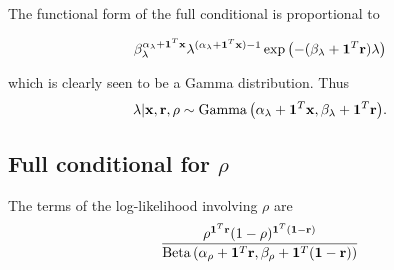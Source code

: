\documentclass{amsart}
\begin{document}
%
%
%

The functional form of the full conditional is proportional to

$$
\beta_{\lambda}^{\alpha_\lambda+{\bf 1}^T{\bf x}} \lambda^{(\alpha_\lambda + {\bf 1}^T{\bf x}) - 1} \exp{\left(-(\beta_\lambda + {\bf1}^T{\bf r}) \lambda \right)}
$$

\noindent which is clearly seen to be a Gamma distribution. Thus
$$
\lambda | {\bf x}, {\bf r}, \rho \sim {\text{Gamma} \left( \alpha_\lambda + {\bf1}^T{\bf x}, \beta_\lambda + {\bf1}^T{\bf r}\right)}.
$$

\subsection{Full conditional for $\rho$}
The terms of the log-likelihood involving $\rho$ are
$$
\frac{\rho^{{\bf 1}^T{\bf r}} (1 - \rho)^{{\bf 1}^T({\bf 1} - {\bf r})}}{{\text{Beta} \left( \alpha_\rho + {\bf 1}^T {\bf r}, \beta_\rho + {\bf 1}^T({\bf 1} - {\bf r}) \right)}}
$$
\end{document}
